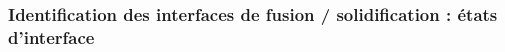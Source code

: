 \documentclass{beamer}
\begin{document}
\begin{frame}
    \frametitle{Identification des interfaces de fusion / solidification : états d'interface}
    \footnotesize
    \begin{columns}[c]
        \begin{column}{0.4\textwidth}
    \begin{center}
		\begin{tikzpicture}[scale = 0.4, every node/.style={scale=0.6}]
        
		\end{tikzpicture}

\end{center}
        \end{column}
\footnotesize
	\begin{column}{0.6\textwidth}
    
    \begin{center}
		\begin{tikzpicture}[scale = 0.5, every node/.style={scale=0.6}]
        
		\end{tikzpicture}

\end{center}
        \end{column}
\normalsize
	\end{columns}

\end{frame}
\end{document}
